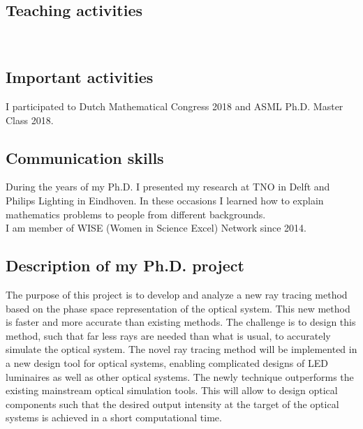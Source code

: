 \documentclass[letterpaper]{twentysecondcv} %
\begin{document}
\subsection{Teaching activities}
\begin{twentyshort}
\\
\end{twentyshort}
\subsection{Important activities}
I participated to Dutch Mathematical Congress 2018 and ASML Ph.D. Master Class 2018.
\subsection{Communication skills}
During the years of my Ph.D. I presented my research at TNO in Delft and Philips Lighting in Eindhoven.
In these occasions I learned how to explain mathematics problems to people from different backgrounds.\\
I am member of WISE (Women in Science Excel) Network since 2014.\\
\subsection{Description of my Ph.D. project}
The purpose of this project is to develop and analyze a new ray tracing method based on the phase space representation of the optical system. This new method is faster and more accurate than existing methods. The challenge is to design this method, such that far less rays are needed than what is usual, to accurately simulate the optical system. The novel ray tracing method will be implemented in a new design tool for optical systems, enabling complicated designs of LED luminaires as well as other optical systems. The newly technique outperforms the existing mainstream optical simulation tools. This will allow to design optical components such that the desired output intensity at the target of the optical systems is achieved in a short computational time.\\

\end{document}
